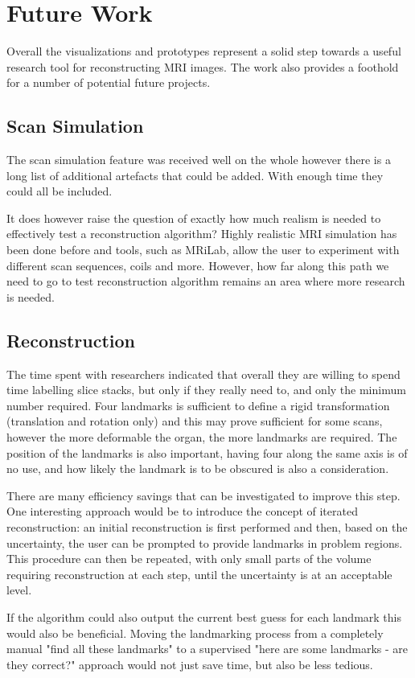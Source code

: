 \chapter{Future Work}
Overall the visualizations and prototypes represent a solid step towards a useful research tool for reconstructing MRI images. The work also provides a foothold for a number of potential future projects.

\section{Scan Simulation}
The scan simulation feature was received well on the whole however there is a long list of additional artefacts that could be added. With enough time they could all be included.

It does however raise the question of exactly how much realism is needed to effectively test a reconstruction algorithm? Highly realistic MRI simulation has been done before and tools, such as MRiLab\cite{mrilab}, allow the user to experiment with different scan sequences, coils and more. However, how far along this path we need to go to test reconstruction algorithm remains an area where more research is needed.

\section{Reconstruction}
The time spent with researchers indicated that overall they are willing to spend time labelling slice stacks, but only if they really need to, and only the minimum number required. Four landmarks is sufficient to define a rigid transformation (translation and rotation only) and this may prove sufficient for some scans, however the more deformable the organ, the more landmarks are required. The position of the landmarks is also important, having four  along the same axis is of no use, and how likely the landmark is to be obscured is also a consideration.

There are many efficiency savings that can be investigated to improve this step. One interesting approach would be to introduce the concept of iterated reconstruction: an initial reconstruction is first performed and then, based on the uncertainty, the user can be prompted to provide landmarks in problem regions. This procedure can then be repeated, with only small parts of the volume requiring reconstruction at each step, until the uncertainty is at an acceptable level.

If the algorithm could also output the current best guess for each landmark this would also be beneficial. Moving the landmarking process from a completely manual "find all these landmarks" to a supervised "here are some landmarks - are they correct?" approach would not just save time, but also be less tedious.

